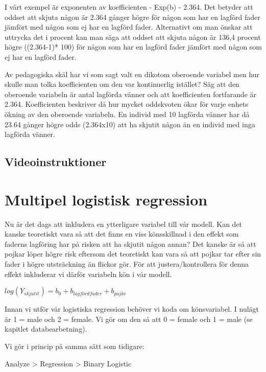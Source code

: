 \documentclass[
]{book}
\begin{document}
I vårt exempel är exponenten av koefficienten - Exp(b) - 2.364. Det betyder att oddset att skjuta någon är 2.364 gånger högre för någon som har en lagförd fader jämfört med någon som ej har en lagförd fader. Alternativt om man önskar att uttrycka det i procent kan man säga att oddset att skjuta någon är 136,4 procent högre ((2.364-1)* 100) för någon som har en lagförd fader jämfört med någon som ej har en lagförd fader.

Av pedagogiska skäl har vi som sagt valt en dikotom oberoende variabel men hur skulle man tolka koefficienten om den var kontinuerlig istället? Säg att den oberoende variabeln är antal lagförda vänner och att koefficienten fortfarande är 2.364. Koefficienten beskriver då hur mycket oddskvoten ökar för varje enhets ökning av den oberoende variabeln. En individ med 10 lagförda vänner har då 23.64 gånger högre odds (2.364x10) att ha skjutit någon än en individ med inga lagförda vänner.

\hypertarget{videoinstruktioner-12}{%
\subsection{Videoinstruktioner}\label{videoinstruktioner-12}}

\hypertarget{multipel-logistisk-regression}{%
\section{Multipel logistisk regression}\label{multipel-logistisk-regression}}

Nu är det dags att inkludera en ytterligare variabel till vår modell. Kan det kanske teoretiskt vara så att det finns en viss könsskillnad i den effekt som faderns lagföring har på risken att ha skjutit någon annan? Det kanske är så att pojkar löper högre risk eftersom det teoretiskt kan vara så att pojkar tar efter sin fader i högre utsträckning än flickor gör. För att justera/kontrollera för denna effekt inkluderar vi därför variabeln kön i vår modell.

\(log(Y_{skjutit}) = b_0 + b_{lagfördfader} + b_{pojke}\)

Innan vi utför vår logistiska regression behöver vi koda om könsvariabel. I nulägt är 1 = male och 2 = female. Vi gör om den så att 0 = female och 1 = male (se kapitlet databearbetning).

Vi gör i princip på samma sätt som tidigare:

Analyze \textgreater{} Regression \textgreater{} Binary Logistic
\end{document}
